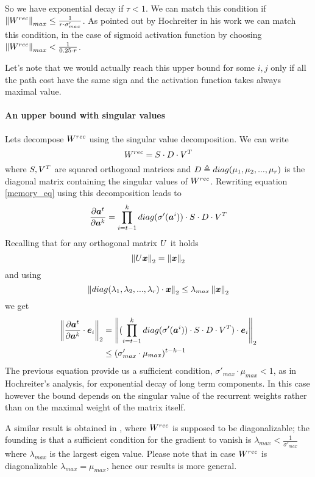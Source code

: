 So we have exponential decay if $\tau<1$. We can match this condition if $\left\Vert W^{rec} \right\Vert_{max} \leq \frac{1}{r\cdot \sigma'_{max}}$.
As pointed out by Hochreiter in his work we can match this condition, in the case of sigmoid activation function by choosing $\left\Vert W^{rec} \right\Vert_{max} < \frac{1}{0.25 \cdot r}$.

Let's note that we would actually reach this upper bound for some $i,j$ only if all the path cost have the same sign and the activation function takes always maximal
value.


\paragraph{An upper bound with singular values}
Lets decompose $W^{rec}$ using the singular value decomposition. We can write
\begin{equation}
 W^{rec} =  S\cdot D\cdot V^T
\end{equation}
where $S,V^T$ are squared orthogonal matrices and $D\triangleq diag(\mu_1, \mu_2,...,\mu_r)$ is the diagonal matrix containing the singular values of $W^{rec}$.
Rewriting equation \ref{memory_eq} using this decomposition leads to
\begin{equation}
\frac{\partial \boldsymbol{a}^t}{\partial \boldsymbol{a}^k} = \prod_{i=t-1}^{k}  diag(\sigma'(\boldsymbol{a}^i)) \cdot S\cdot D \cdot V^T
\label{memory_eq}
\end{equation}
Recalling that for any orthogonal matrix $U$ it holds $$\left\Vert U\boldsymbol{x} \right\Vert_2=\left\Vert \boldsymbol{x} \right\Vert_2$$  and using 
$$\left\Vert diag(\lambda_1, \lambda_2,...,\lambda_r)\cdot \boldsymbol{x} \right\Vert_2 \leq \lambda_{max} \left\Vert \boldsymbol{x} \right\Vert_2$$ we get
\begin{align}
\left\Vert \frac{\partial \boldsymbol{a}^t}{\partial \boldsymbol{a}^k} \cdot \boldsymbol{e}_i \right\Vert_2 &= \left\Vert  (\prod_{i=t-1}^{k} diag(\sigma'(\boldsymbol{a}^i)) \cdot S\cdot D \cdot V^T) \cdot \boldsymbol{e}_i \right\Vert_2\\
&\leq (\sigma'_{max} \cdot \mu_{max})^{t-k-1}
\end{align}
The previous equation provide us a sufficient condition, $\sigma'_{max} \cdot \mu_{max} <1 $, as in Hochreiter's analysis, for exponential decay of long term components. In this case however the bound depends on the singular value
of the recurrent weights rather than on the maximal weight of the matrix itself. 

A similar result is obtained in \cite{pascanu}, where $W^{rec}$ is supposed to be diagonalizable; the founding is that a sufficient condition for the gradient to vanish is $\lambda_{max} <  \frac{1}{\sigma'_{max}}$ where $\lambda_{max}$ is the largest eigen value. Please note that in case $W^{rec}$ is diagonalizable $\lambda_{max}=\mu_{max}$, hence our results is more general.

